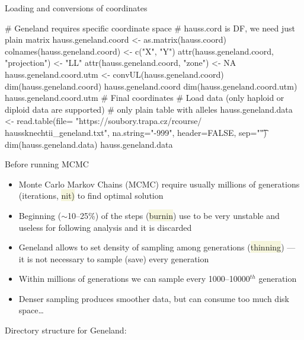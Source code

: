 \documentclass[compress, xelatex, 11pt, xcolor=svgnames, aspectratio=169,
	hyperref={
		bookmarks=true,
		unicode=true,
		colorlinks=true,
		pdftitle={Molecular data in R},
		plainpages=false,
		pdfauthor={Vojtech Zeisek},
		pdfsubject={Course about phylogeny and evolution in R},
		pdfcreator={XeLaTeX},
		pdfkeywords={R, evolution, phylogeny, molecular data},
		linkcolor=Crimson, %
		anchorcolor=Magenta, %
		citecolor=Magenta, %
		filecolor=Magenta, %
		menucolor=Magenta, %
		urlcolor=DodgerBlue, %
		},
	url={hyphens, lowtilde} %
	]{beamer}
\renewcommand{\texttt}[1]{\colorbox{Beige}{{\ttfamily #1}}}
\begin{document}
\begin{frame}[fragile]{Loading and conversions of coordinates}
	\begin{spluscode}
    # Geneland requires specific coordinate space
    # hauss.cord is DF, we need just plain matrix
    hauss.geneland.coord <- as.matrix(hauss.coord)
    colnames(hauss.geneland.coord) <- c("X", "Y")
    attr(hauss.geneland.coord, "projection") <- "LL"
    attr(hauss.geneland.coord, "zone") <- NA
    hauss.geneland.coord.utm <- convUL(hauss.geneland.coord)
    dim(hauss.geneland.coord)
    hauss.geneland.coord
    dim(hauss.geneland.coord.utm)
    hauss.geneland.coord.utm # Final coordinates
    # Load data (only haploid or diploid data are supported)
    # only plain table with alleles
    hauss.geneland.data <- read.table(file= "https://soubory.trapa.cz/rcourse/
      haussknechtii_geneland.txt", na.string="-999", header=FALSE, sep="\t")
    dim(hauss.geneland.data)
    hauss.geneland.data
	\end{spluscode}
\end{frame}

\begin{frame}{Before running MCMC}
	\begin{multicols}{2}
		\begin{itemize}
			\item Monte Carlo Markov Chains (MCMC) require usually millions of generations (iterations, \texttt{nit)} to find optimal solution
			\item Beginning ($\sim$10--25\%) of the steps (\texttt{burnin}) use to be very unstable and useless for following analysis and it is discarded
			\item Geneland allows to set density of sampling among generations (\texttt{thinning}) --- it is not necessary to sample (save) every generation
			\item Within millions of generations we can sample every 1000--10000$^{th}$ generation
			\item Denser sampling produces smoother data, but can consume too much disk space\ldots
		\end{itemize}
		\vfill
		Directory structure for Geneland:
		\vfill
		\begin{center}
			\texttt{[image: genelad\_dirs.png]}
		\end{center}
		\vfil
	\end{multicols}
\end{frame}
\end{document}
